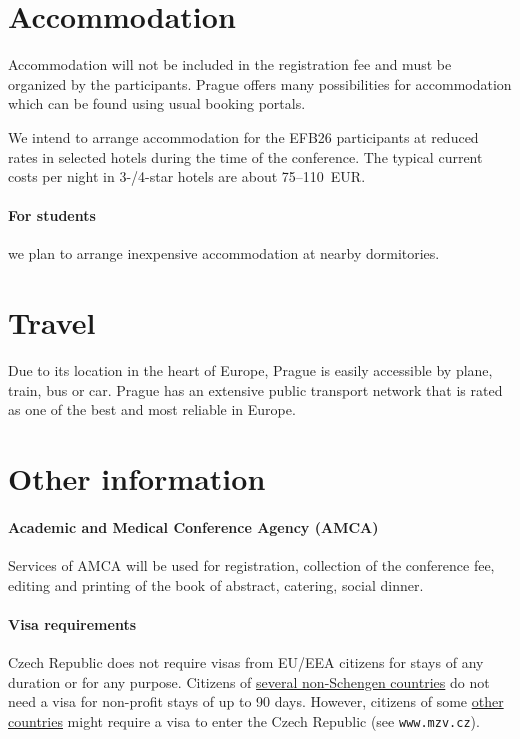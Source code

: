 \documentclass[12pt]{extarticle}
\begin{document}
\section*{Accommodation}
\noindent
Accommodation will not be included in the registration fee and must be
organized by the participants. Prague offers many possibilities for
accommodation which can be found using usual booking portals.

We intend to arrange accommodation for the EFB26 participants at
reduced rates in selected hotels during the time of the conference.
The typical current costs per night in 3-{}/4-star hotels are about
75--110~EUR.

\paragraph{For students} we plan to arrange inexpensive accommodation
at nearby dormitories.

\section*{Travel}
\noindent
Due to its location in the heart of Europe, Prague is easily
accessible by plane, train, bus or car. Prague has an extensive public
transport network that is rated as one of the best and most reliable
in Europe.

\section*{Other information}

\paragraph{Academic and Medical Conference Agency (AMCA)}
Services of AMCA will be used for registration, collection of the
conference fee, editing and printing of the book of abstract,
catering, social dinner.

\paragraph{Visa requirements}
Czech Republic does not require visas from EU/EEA citizens for stays
of any duration or for any purpose. Citizens of
\href{https://www.mzv.cz/jnp/en/information_for_aliens/short_stay_visa/list_of_states_whose_citizens_are_exempt/index.html}{several
  non-Schengen countries} do not need a visa for non-profit stays of
up to 90 days. However, citizens of some
\href{https://www.mzv.cz/jnp/en/information_for_aliens/short_stay_visa/list_of_states_whose_citizens_are/index.html}{other
  countries} might require a visa to enter the Czech Republic (see
\texttt{www.mzv.cz}).
\end{document}

